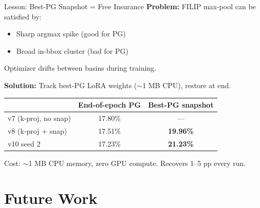 \documentclass[aspectratio=169,12pt]{beamer}
\begin{document}
\begin{frame}{Lesson: Best-PG Snapshot = Free Insurance}
  \textbf{Problem:} FILIP max-pool can be satisfied by:
  \begin{itemize}
    \item Sharp argmax spike (good for PG) {\color{positive}\checkmark}
    \item Broad in-bbox cluster (bad for PG) {\color{negative}\texttimes}
  \end{itemize}
  Optimizer drifts between basins during training.

  \vspace{0.5em}
  \textbf{Solution:} Track best-PG LoRA weights ($\sim$1 MB CPU), restore at end.

  \vspace{0.5em}
  \begin{center}
    \begin{tabular}{l c c}
      \toprule
      & End-of-epoch PG & Best-PG snapshot \\
      \midrule
      v7 (k-proj, no snap) & 17.80\% & — \\
      v8 (k-proj + snap) & 17.51\% & \textbf{19.96\%} \\
      v10 seed 2 & 17.23\% & \textbf{21.23\%} \\
      \bottomrule
    \end{tabular}
  \end{center}

  {\small \color{muted} Cost: $\sim$1 MB CPU memory, zero GPU compute. Recovers 1--5 pp every run.}
\end{frame}

\section{Future Work}
\end{document}
